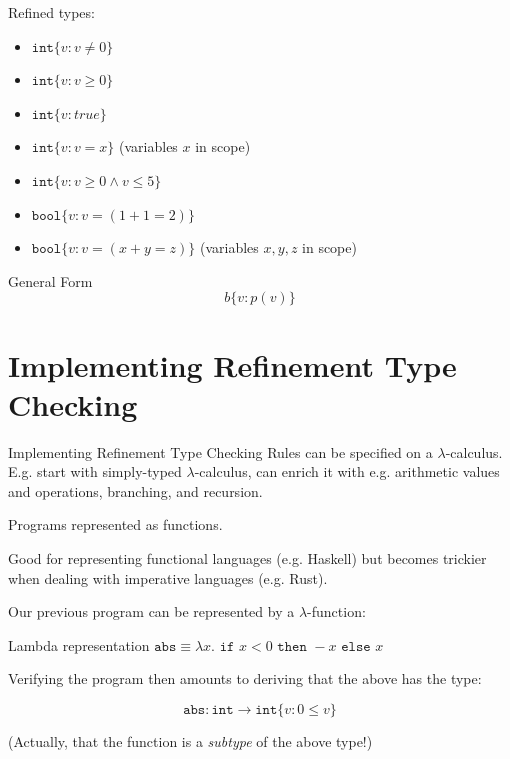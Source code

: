 \documentclass{beamer}
\begin{document}
\begin{frame}
Refined types: 
\begin{itemize} 
\item
$\texttt{int} \{ v : v \not= 0\}$
\item
$\texttt{int} \{ v : v \geq 0\}$
\item 
$\texttt{int} \{ v : true \} $
\item
$\texttt{int} \{ v : v = x  \}$ (variables $x$ in scope)
\item
$\texttt{int} \{ v : v \geq 0 \wedge v \leq 5 \}$
\item 
$\texttt{bool} \{ v : v = (1+1 = 2) \}$
\item 
$\texttt{bool} \{ v : v = (x+y = z) \}$ (variables $x,y,z$ in scope)
\end{itemize} 

\begin{block}{General Form} 
\[
b \{ v : p(v) \}
\]
\end{block}
\end{frame} 




\section{Implementing Refinement Type Checking} 
\begin{frame}{Implementing Refinement Type Checking} 
Rules can be specified on a $\lambda$-calculus. 
E.g. start with simply-typed $\lambda$-calculus, can enrich it with e.g. arithmetic values and operations, branching, and recursion.

Programs represented as functions.

Good for representing functional languages (e.g. Haskell) but becomes trickier when dealing with imperative languages (e.g. Rust).
\end{frame} 

\begin{frame}{}
Our previous program can be represented by a $\lambda$-function: 
\begin{block}{Lambda representation}
$\texttt{abs} \equiv \lambda x. \texttt{ if } x < 0 \texttt{ then } -x \texttt{ else } x$
\end{block} 

Verifying the program then amounts to deriving that the above has the type: 
\begin{block}{}
\[
\texttt{abs} : \texttt{int} \rightarrow \texttt{int}\{v : 0 \leq v\}
\]
\end{block}
(Actually, that the function is a \emph{subtype} of the above type!)
\end{frame}
\end{document}
